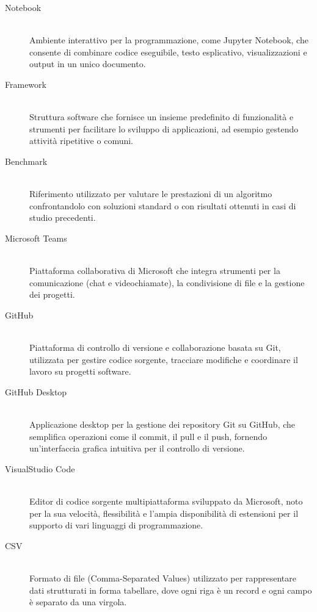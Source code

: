 \begin{description}
    \item[Notebook] \hfill \\
    Ambiente interattivo per la programmazione, come Jupyter Notebook, che consente di combinare codice eseguibile, testo esplicativo, visualizzazioni e output in un unico documento.

    \item[Framework] \hfill \\
    Struttura software che fornisce un insieme predefinito di funzionalità e strumenti per facilitare lo sviluppo di applicazioni, ad esempio gestendo attività ripetitive o comuni.

    \item[Benchmark] \hfill \\
    Riferimento utilizzato per valutare le prestazioni di un algoritmo confrontandolo con soluzioni standard o con risultati ottenuti in casi di studio precedenti.

    \item[Microsoft Teams] \hfill \\
    Piattaforma collaborativa di Microsoft che integra strumenti per la comunicazione (chat e videochiamate), la condivisione di file e la gestione dei progetti.

    \item[GitHub] \hfill \\
    Piattaforma di controllo di versione e collaborazione basata su Git, utilizzata per gestire codice sorgente, tracciare modifiche e coordinare il lavoro su progetti software.

    \item[GitHub Desktop] \hfil \\
    Applicazione desktop per la gestione dei repository Git su GitHub, che semplifica operazioni come il commit, il pull e il push, fornendo un'interfaccia grafica intuitiva per il controllo di versione.

    \item[VisualStudio Code] \hfill \\
    Editor di codice sorgente multipiattaforma sviluppato da Microsoft, noto per la sua velocità, flessibilità e l'ampia disponibilità di estensioni per il supporto di vari linguaggi di programmazione.

    \item[CSV] \hfill \\
    Formato di file (Comma-Separated Values) utilizzato per rappresentare dati strutturati in forma tabellare, dove ogni riga è un record e ogni campo è separato da una virgola.


\end{description}
